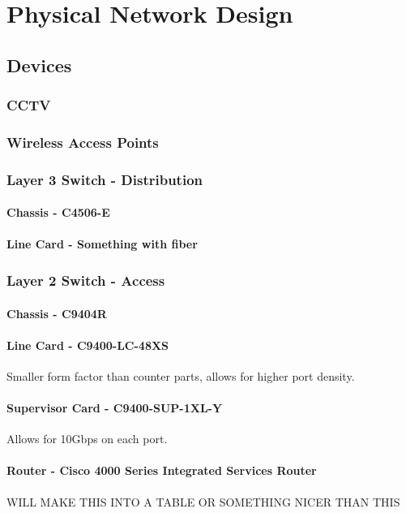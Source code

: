 \chapter{Physical Network Design}

\section{Devices}
\subsection{CCTV}
\subsection{Wireless Access Points}
\subsection{Layer 3 Switch - Distribution}
\subsubsection{Chassis - C4506-E}
\subsubsection{Line Card - Something with fiber}
\subsection{Layer 2 Switch - Access}
\subsubsection{Chassis - C9404R}
\subsubsection{Line Card - C9400-LC-48XS}
Smaller form factor than counter parts, allows for higher port density.
\subsubsection{Supervisor Card - C9400-SUP-1XL-Y}
Allows for 10Gbps on each port.
\subsubsection{Router -  Cisco 4000 Series Integrated Services Router}
\begin{huge}
    WILL MAKE THIS INTO A TABLE OR SOMETHING NICER THAN THIS
\end{huge}
